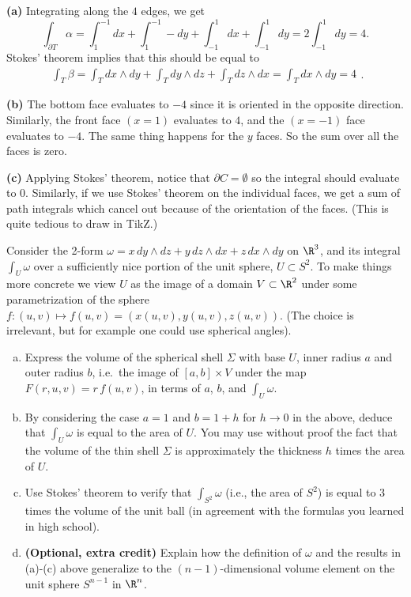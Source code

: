 \documentclass[11pt,letterpaper]{article}
\begin{document}
\begin{solution}
    \textbf{(a)} Integrating along the $4$ edges, we get
    \[
        \int_{\partial T}\alpha = \int^{-1}_1dx+\int_1^{-1}-dy+\int_{-1}^1dx+\int_{-1}^1dy = 2\int^1_{-1} dy=4
    .\] 
    Stokes' theorem implies that this should be equal to 
    \[
        \begin{aligned}
        \int_{T}\beta=\int_T dx\wedge dy+\int_T dy\wedge dz+\int_T dz\wedge dx=\int_T dx\wedge dy=4
        \end{aligned}
    .\] 
    
    \textbf{(b)} The bottom face evaluates to $-4$ since it is oriented in the opposite direction. Similarly, the front face $(x=1)$ evaluates to $4$, and the $(x=-1)$ face evaluates to $-4$. The same thing happens for the $y$ faces. So the sum over all the faces is zero.

    \textbf{(c)} Applying Stokes' theorem, notice that $\partial C = \emptyset$ so the integral should evaluate to $0$. Similarly, if we use Stokes' theorem on the individual faces, we get a sum of path integrals which cancel out because of the orientation of the faces. (This is quite tedious to draw in TikZ.)
\end{solution}

\begin{problem}
    Consider the 2-form $\omega=x\,dy\wedge dz+y\,dz\wedge dx+z\,dx\wedge dy$ on $\R^3$, and its integral $\int_U \omega$ over a sufficiently nice portion of the unit sphere, $U\subset S^2$. To make things more concrete we view $U$ as the image of a domain $V\subset \R^2$ under some parametrization of the sphere $f:(u,v)\mapsto f(u,v)=(x(u,v),y(u,v),z(u,v))$. (The choice is irrelevant, but for example one could use spherical angles).
    
    \begin{enumerate}[(a)]
        \item Express the volume of the spherical shell $\Sigma$ with base $U$, inner radius $a$ and outer radius $b$, i.e.\ the image of $[a,b]\times V$ under the map $F(r,u,v)=r\,f(u,v)$, in terms of $a$, $b$, and $\int_U\omega$.
        \item By considering the case $a=1$ and $b=1+h$ for $h\to 0$ in the above, deduce that $\int_U\omega$ is equal to the area of $U$. You may use without proof the fact that the volume of the thin shell $\Sigma$ is approximately the thickness $h$ times the area of $U$.
        \item Use Stokes' theorem to verify that $\int_{S^2}\omega$ (i.e., the area of $S^2$) is equal to 3 times the volume of the unit ball (in agreement with the formulas you learned in high school).
        \item \textbf{(Optional, extra credit)} Explain how the definition of $\omega$ and the results in (a)-(c) above 
        generalize to the $(n-1)$-dimensional volume element on the unit sphere $S^{n-1}$ in $\R^n$.
    \end{enumerate}
\end{problem}
\end{document}
